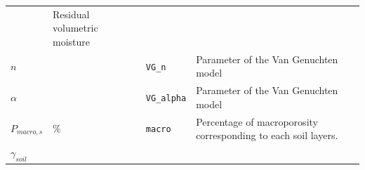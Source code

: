 \documentclass[]{book}
\begin{document}
\begin{longtable}[]{@{}llll@{}}
\begin{minipage}[t]{0.12\columnwidth}
\end{minipage} & \begin{minipage}[t]{0.45\columnwidth}\raggedright
Residual volumetric moisture\strut
\end{minipage}\tabularnewline
\begin{minipage}[t]{0.11\columnwidth}\raggedright
\(n\)\strut
\end{minipage} & \begin{minipage}[t]{0.10\columnwidth}\raggedright
\strut
\end{minipage} & \begin{minipage}[t]{0.12\columnwidth}\raggedright
\texttt{VG\_n}\strut
\end{minipage} & \begin{minipage}[t]{0.45\columnwidth}\raggedright
Parameter of the Van Genuchten \citeyearpar{Genuchten1980} model\strut
\end{minipage}\tabularnewline
\begin{minipage}[t]{0.11\columnwidth}\raggedright
\(\alpha\)\strut
\end{minipage} & \begin{minipage}[t]{0.10\columnwidth}\raggedright
\strut
\end{minipage} & \begin{minipage}[t]{0.12\columnwidth}\raggedright
\texttt{VG\_alpha}\strut
\end{minipage} & \begin{minipage}[t]{0.45\columnwidth}\raggedright
Parameter of the Van Genuchten \citeyearpar{Genuchten1980} model\strut
\end{minipage}\tabularnewline
\begin{minipage}[t]{0.11\columnwidth}\raggedright
\(P_{macro, s}\)\strut
\end{minipage} & \begin{minipage}[t]{0.10\columnwidth}\raggedright
\%\strut
\end{minipage} & \begin{minipage}[t]{0.12\columnwidth}\raggedright
\texttt{macro}\strut
\end{minipage} & \begin{minipage}[t]{0.45\columnwidth}\raggedright
Percentage of macroporosity corresponding to each soil layers.\strut
\end{minipage}\tabularnewline
\begin{minipage}[t]{0.11\columnwidth}\raggedright
\(\gamma_{soil}\)\strut
\end{minipage} & \begin{minipage}[t]{0.10\columnwidth}\raggedright

\end{minipage}
\end{longtable}
\end{document}
